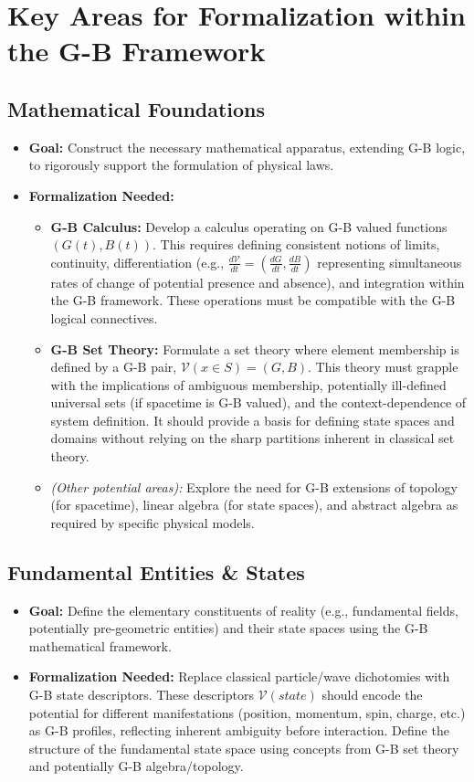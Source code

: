 \documentclass{article}
\begin{document}
\section{Key Areas for Formalization within the G-B Framework}

\subsection{Mathematical Foundations}
\begin{itemize}
    \item \textbf{Goal:} Construct the necessary mathematical apparatus, extending G-B logic, to rigorously support the formulation of physical laws.
    \item \textbf{Formalization Needed:}
        \begin{itemize}
            \item \textbf{G-B Calculus:} Develop a calculus operating on G-B valued functions $(G(t), B(t))$. This requires defining consistent notions of limits, continuity, differentiation (e.g., $\frac{d\mathcal{V}}{dt} = (\frac{dG}{dt}, \frac{dB}{dt})$ representing simultaneous rates of change of potential presence and absence), and integration within the G-B framework. These operations must be compatible with the G-B logical connectives.
            \item \textbf{G-B Set Theory:} Formulate a set theory where element membership is defined by a G-B pair, $\mathcal{V}(x \in S) = (G, B)$. This theory must grapple with the implications of ambiguous membership, potentially ill-defined universal sets (if spacetime is G-B valued), and the context-dependence of system definition. It should provide a basis for defining state spaces and domains without relying on the sharp partitions inherent in classical set theory.
            \item \textit{(Other potential areas):} Explore the need for G-B extensions of topology (for spacetime), linear algebra (for state spaces), and abstract algebra as required by specific physical models.
        \end{itemize}
\end{itemize}

\subsection{Fundamental Entities \& States}
\begin{itemize}
    \item \textbf{Goal:} Define the elementary constituents of reality (e.g., fundamental fields, potentially pre-geometric entities) and their state spaces using the G-B mathematical framework.
    \item \textbf{Formalization Needed:} Replace classical particle/wave dichotomies with G-B state descriptors. These descriptors $\mathcal{V}(state)$ should encode the potential for different manifestations (position, momentum, spin, charge, etc.) as G-B profiles, reflecting inherent ambiguity before interaction. Define the structure of the fundamental state space using concepts from G-B set theory and potentially G-B algebra/topology.
\end{itemize}
\end{document}
